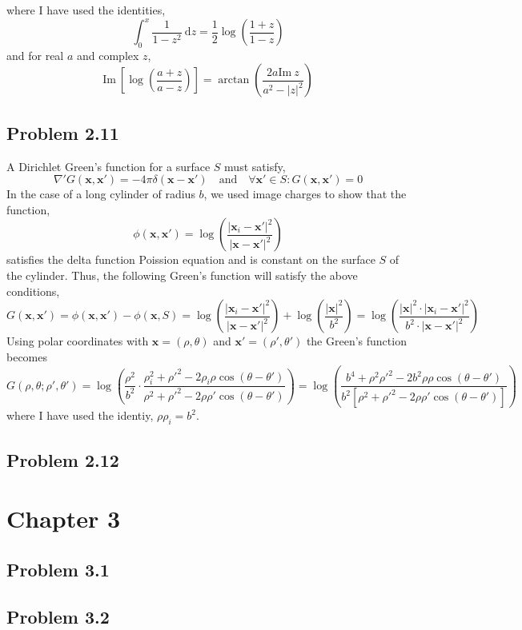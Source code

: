 \documentclass[12pt]{extarticle}
\renewcommand{\Im}[1]{\mathrm{Im} \: #1}
\renewcommand{\d}[1]{\: \mathrm{d}#1}
\theoremstyle{definition}
\newcommand{\x}{\mathbf{x}}
\begin{document}
where I have used the identities,
\[ \int_0^x \frac{1}{1 - z^2} \d{z} = \frac{1}{2} \log{\left( \frac{1 + z}{1 - z} \right)} \]
and for real $a$ and complex $z$,
\[ \Im{\left[ \log{\left( \frac{a + z}{a - z} \right)} \right]} = \arctan{\left( \frac{2 a \Im{z}}{a^2 - |z|^2} \right)} \]

\subsection{Problem 2.11}

A Dirichlet Green's function for a surface $S$ must satisfy,
\[ \nabla' G(\x, \x') = -4 \pi \delta(\x - \x') \quad \text{and} \quad \forall \x' \in S : G(\x, \x') = 0 \]
In the case of a long cylinder of radius $b$, we used image charges to show that the function,
\[ \phi(\x, \x') = \log{\left( \frac{|\x_i - \x'|^2}{|\x - \x'|^2} \right)} \]
satisfies the delta function Poission equation and is constant on the surface $S$ of the cylinder. Thus, the following Green's function will satisfy the above conditions,
\[ G(\x, \x') = \phi(\x, \x') - \phi(\x, S) = \log{\left( \frac{|\x_i - \x'|^2}{|\x - \x'|^2} \right)} + \log{\left( \frac{|\x|^2}{b^2} \right)} = \log{\left( \frac{|\x|^2 \cdot |\x_i - \x'|^2}{b^2 \cdot |\x - \x'|^2} \right)}  \]
Using polar coordinates with $\x = (\rho, \theta)$ and $\x' = (\rho', \theta')$ the Green's function becomes
\[ G(\rho, \theta ; \rho', \theta') = \log{\left( \frac{\rho^2}{b^2} \cdot \frac{\rho_i^2 + \rho'^2 - 2 \rho_i \rho \cos{(\theta - \theta')}}{\rho^2 + \rho'^2 - 2 \rho \rho' \cos{(\theta - \theta')}} \right)} = \log{\left( \frac{b^4 + \rho^2 \rho'^2 - 2 b^2 \rho \rho \cos{(\theta - \theta')}}{b^2 \left[ \rho^2 + \rho'^2 - 2 \rho \rho' \cos{(\theta - \theta')} \right] } \right)} \]
where I have used the identiy, $\rho \rho_i = b^2$. 

\subsection{Problem 2.12}


\section{Chapter 3}

\subsection{Problem 3.1}

\subsection{Problem 3.2}
\end{document}
